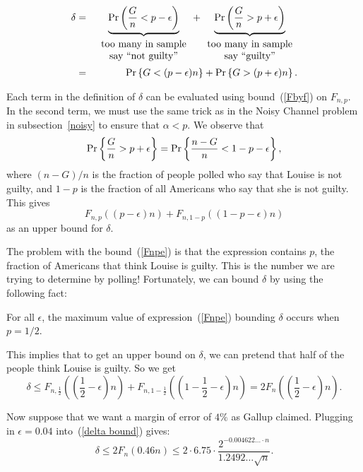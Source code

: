 \documentclass[11pt,twoside]{article}
\begin{document}
\begin{eqnarray*}
\delta  & = &
        \underbrace{\Pr\left(\frac{G}{n} < p - \epsilon\right)}_{
\begin{array}{c}
\mbox{too many in sample} \\
\mbox{say ``not guilty''}
\end{array}}
        + \underbrace{\Pr\left(\frac{G}{n} > p + \epsilon\right)}_{
\begin{array}{c}
\mbox{too many in sample} \\
\mbox{say ``guilty''}
\end{array}} \\
        & = & \mathop{\textup{Pr}}\nolimits\left\{G < (p - \epsilon) n\right\} + \mathop{\textup{Pr}}\nolimits\left\{G > (p + \epsilon) n\right\}.
\end{eqnarray*}

Each term in the definition of $\delta$ can be evaluated using
bound~(\ref{Fbyf}) on $F_{n,p}$.  In the second term, we must use the same
trick as in the Noisy Channel problem in subsection~\ref{noisy} to
ensure that $\alpha < p$.  We observe that
\[
\mathop{\textup{Pr}}\nolimits\left\{\frac{G}{n} > p + \epsilon\right\} = \mathop{\textup{Pr}}\nolimits\left\{\frac{n - G}{n} < 1 -p - \epsilon\right\},
\]
where $(n - G)/n$ is the fraction of people polled who say that
Louise is not guilty, and $1-p$ is the fraction of all Americans who say
that she is not guilty.  This gives
\begin{equation}\label{Fnpe}
F_{n,p}((p - \epsilon) n) + F_{n,1-p}((1-p-\epsilon) n)
\end{equation}
as an upper bound for $\delta$.

The problem with the bound~(\ref{Fnpe}) is that the expression contains
$p$, the fraction of Americans that think Louise is guilty.  This is the
number we are trying to determine by polling!  Fortunately, we can bound
$\delta$ by using the following fact:
\begin{fact}
For all $\epsilon$, the maximum value of expression~(\ref{Fnpe}) bounding
$\delta$ occurs when $p = 1/2$.
\end{fact}

This implies that to get an upper bound on $\delta$, we can pretend that
half of the people think Louise is guilty.  So we get
\begin{equation}\label{delta bound}
\delta \leq F_{n,\frac{1}{2}}((\frac{1}{2} - \epsilon) n) +
   F_{n,1-\frac{1}{2}}((1-\frac{1}{2}-\epsilon) n)
 = 2 F_{n}((\frac{1}{2} - \epsilon) n).
\end{equation}

Now suppose that we want a margin of error of $4\%$ as Gallup claimed.
Plugging in $\epsilon = 0.04$ into~(\ref{delta bound}) gives:
\begin{equation*}
\delta \leq   2 F_{n}(0.46 n)
 \leq 
2 \cdot 6.75 \cdot \frac{2^{-0.004622\ldots \cdot n}}{1.2492\ldots \sqrt{n}}.
\end{equation*}
\end{document}
